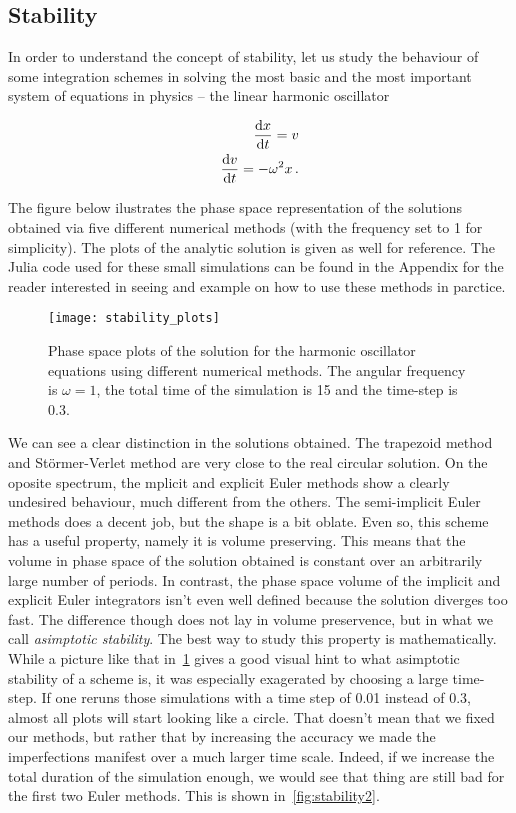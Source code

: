 \documentclass[12pt, class=report, crop=false]{standalone}
\begin{document}
\subsection{Stability}
\label{sec:stability}

In order to understand the concept of stability, let us study the behaviour of some integration schemes in solving the most basic and the most important system of equations in physics -- the linear harmonic oscillator

\begin{subequations}
  \label{eq:HO}
  \begin{align}
    \dv{x}{t} = v\\
    \dv{v}{t} = -\omega^2 x\,.
  \end{align}
\end{subequations}

The figure below ilustrates the phase space representation of the solutions obtained via five different numerical methods (with the frequency set to 1 for simplicity). The plots of the analytic solution is given as well for reference. The Julia code used for these small simulations can be found in the Appendix for the reader interested in seeing and example on how to use these methods in parctice.

\begin{figure}[h]
  \centering
  \texttt{[image: stability\_plots]}%
  \caption{Phase space plots of the solution for the harmonic oscillator equations using different numerical methods. The angular frequency is \(\omega =1\), the total time of the simulation is 15 and the time-step is 0.3.}\label{fig:stability}%
\end{figure}

We can see a clear distinction in the solutions obtained. The trapezoid method and Störmer-Verlet method are very close to the real circular solution. On the oposite spectrum, the mplicit and explicit Euler methods show a clearly undesired behaviour, much different from the others. The semi-implicit Euler methods does a decent job, but the shape is a bit oblate. Even so, this scheme has a useful property, namely it is volume preserving. This means that the volume in phase space of the solution obtained is constant over an arbitrarily large number of periods. In contrast, the phase space volume of the implicit and explicit Euler integrators isn't even well defined because the solution diverges too fast. The difference though does not lay in volume preservence, but in what we call \textit{asimptotic stability}. The best way to study this property is mathematically. While a picture like that in~\cref{fig:stability} gives a good visual hint to what asimptotic stability of a scheme is, it was especially exagerated by choosing a large time-step. If one reruns those simulations with a time step of 0.01 instead of 0.3, almost all plots will start looking like a circle. That doesn't mean that we fixed our methods, but rather that by increasing the accuracy we made the imperfections manifest over a much larger time scale. Indeed, if we increase the total duration of the simulation enough, we would see that thing are still bad for the first two Euler methods. This is shown in~\cref{fig:stability2}.
\end{document}
